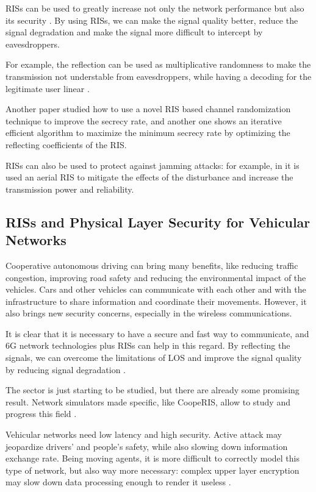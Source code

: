 \documentclass[conference]{IEEEtran}
\begin{document}
RISs can be used to greatly increase not only the network performance but also its security \cite{10409564}. By using RISs, we can make the signal quality better, reduce the signal degradation and make the signal more difficult to intercept by eavesdroppers.

For example, the reflection can be used as multiplicative randomness to make the transmission not understable from eavesdroppers, while having a decoding for the legitimate user linear \cite{9328149}.

Another paper \cite{s21041439} studied how to use a novel RIS based channel randomization technique to improve the secrecy rate, and another one \cite{8742603} shows an iterative efficient algorithm to maximize the minimum secrecy rate by optimizing the reflecting coefficients of the RIS.

RISs can also be used to protect against jamming attacks: for example, in \cite{9424472} it is used an aerial RIS to mitigate the effects of the disturbance and increase the transmission power and reliability.

\subsection{RISs and Physical Layer Security for Vehicular Networks}

Cooperative autonomous driving can bring many benefits, like reducing traffic congestion, improving road safety and reducing the environmental impact of the vehicles. Cars and other vehicles can communicate with each other and with the infrastructure to share information and coordinate their movements. However, it also brings new security concerns, especially in the wireless communications.

It is clear that it is necessary to have a secure and fast way to communicate, and 6G network technologies plus RISs can help in this regard. By reflecting the signals, we can overcome the limitations of LOS and improve the signal quality by reducing signal degradation \cite{10715713}.

The sector is just starting to be studied, but there are already some promising result. Network simulators made specific, like CoopeRIS, allow to study and progress this field \cite{SEGATA2024110443}.

Vehicular networks need low latency and high security. Active attack may jeopardize drivers' and people's safety, while also slowing down information exchange rate. Being moving agents, it is more difficult to correctly model this type of network, but also way more necessary: complex upper layer encryption may slow down data processing enough to render it useless \cite{8403278}.
\end{document}
